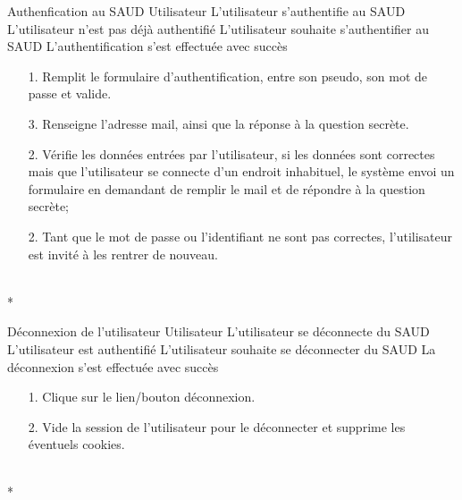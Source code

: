 \documentclass[a4paper,11pt,french]{article}
\begin{document}
\fiche
	{Authenfication au SAUD}
	{Utilisateur}
	{L'utilisateur s'authentifie au SAUD}
	{L'utilisateur n'est pas déjà authentifié}
	{L'utilisateur souhaite s'authentifier au SAUD}
	{L'authentification s'est effectuée avec succès}
	{\begin{itemize}
	    \item[]
		\item[1.] Remplit le formulaire d'authentification, entre son pseudo,
		son mot de passe et valide.
		\item[3.] Renseigne l'adresse mail, ainsi que la réponse à la question secrète.
	\end{itemize}
	}
	{\begin{itemize}
        \item[]
		\item[2.] Vérifie les données entrées par l'utilisateur, 
 si les données sont correctes mais que l'utilisateur se connecte d'un endroit
inhabituel, le système envoi un formulaire en demandant de remplir le mail et de répondre à la question secrète;
	\end{itemize}
	}
	{}
\flots
    {\begin{itemize}
    \item[]
    \item[2.] Tant que le mot de passe ou l'identifiant ne sont pas correctes, l'utilisateur 
    est invité à les rentrer de nouveau.
    \end{itemize}
    }
    {}    
\\*

\fiche
	{Déconnexion de l'utilisateur}
	{Utilisateur}
	{L'utilisateur se déconnecte du SAUD}
	{L'utilisateur est authentifié}
	{L'utilisateur souhaite se déconnecter du SAUD}
	{La déconnexion s'est effectuée avec succès}
	{\begin{itemize}
	    \item[]
		\item[1.] Clique sur le lien/bouton déconnexion.
	\end{itemize}
	}
	{\begin{itemize}
        \item[]
		\item[2.] Vide la session de l'utilisateur pour le déconnecter et 
		supprime les éventuels cookies.
	\end{itemize}
	}
	{}
\flots
    {}
	{}    
\\*
\end{document}
